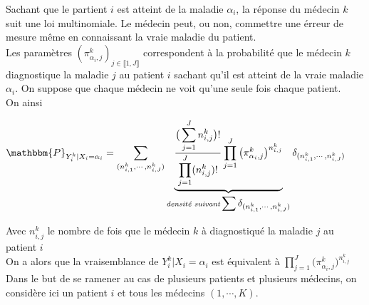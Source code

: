 \documentclass[frenchb]{report}
\newcommand{\1}{\mathbbm{1}}
\newcommand{\prob}{\mathbbm{P}}
\theoremstyle{definition}\newtheorem{defn}{Définition}
\theoremstyle{definition}\newtheorem{exm}{Exemple}
\theoremstyle{definition}\newtheorem{nota}{Notation}
\theoremstyle{definition}\newtheorem{rem}{Remarque}
\begin{document}
Sachant que le partient $i$ est atteint de la maladie $\alpha_i$, la réponse du médecin $k$ suit une loi multinomiale. Le médecin peut, ou non, commettre une érreur de mesure même en connaissant la vraie maladie du patient. \\

Les paramètres $(\pi^k_{\alpha_i,j})_{j \in \llbracket 1,J \rrbracket}$ correspondent à la probabilité que le médecin $k$ diagnostique la maladie $j$ au patient $i$ sachant qu'il est atteint de la vraie maladie $\alpha_i$. On suppose que chaque médecin ne voit qu'une seule fois chaque patient.\\

On ainsi
\begin{center}
$\prob_{Y^k_i|X_i = \alpha_i} = \displaystyle \sum_{(n^k_{i,1}, \cdots, n^k_{i,J})} \underbrace{\frac{\big(\displaystyle \sum_{j=1}^J n^k_{i,j}\big)!}{\displaystyle \prod_{j=1}^J (n^k_{i,j})!}\displaystyle \prod_{j=1}^J \big(\pi^k_{\alpha_i,j}\big)^{n^k_{i,j}}}_{\textit{densité suivant} \displaystyle \sum \delta_{(n^k_{i,1}, \cdots, n^k_{i,J})}} \delta_{(n^k_{i,1}, \cdots, n^k_{i,J})}$
\end{center}

Avec $n^k_{i,j}$ le nombre de fois que le médecin $k$ à diagnostiqué la maladie $j$ au patient $i$\\

On a alors que la vraisemblance de $Y^k_i | X_i = \alpha_i$ est équivalent à $\displaystyle \prod_{j=1}^J \big(\pi^k_{\alpha_i,j}\big)^{n^k_{i,j}}$\\


Dans le but de se ramener au cas de plusieurs patients et plusieurs médecins, on considère ici un patient $i$ et tous les médecins $(1, \cdots, K)$.
\end{document}
